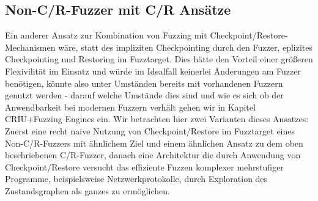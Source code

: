 \documentclass[a4paper]{article}
\begin{document}
\subsection{Non-C/R-Fuzzer mit C/R Ansätze}
Ein anderer Ansatz zur Kombination von Fuzzing mit Checkpoint/Restore-Mechanismen wäre, statt des impliziten Checkpointing durch den Fuzzer, eplizites Checkpointing und Restoring im Fuzztarget. 
Dies hätte den Vorteil einer größeren Flexivilität im Einsatz und würde im Idealfall keinerlei Änderungen am Fuzzer benötigen, könnte also unter Umständen bereits mit vorhandenen Fuzzern genutzt werden - darauf welche Umstände dies sind und wie es sich ob der Anwendbarkeit bei modernen Fuzzern verhält gehen wir in Kapitel CRIU+Fuzzing Engines ein.
Wir betrachten hier zwei Varianten dieses Ansatzes: Zuerst eine recht naive Nutzung von Checkpoint/Restore im Fuzztarget eines Non-C/R-Fuzzers mit ähnlichem Ziel und einem ähnlichen Ansatz zu dem oben beschriebenen C/R-Fuzzer, danach eine Architektur die durch Anwendung von Checkpoint/Restore versucht das effiziente Fuzzen komplexer mehrstufiger Programme, beispielsweise Netzwerkprotokolle, durch Exploration des Zustandsgraphen als ganzes zu ermöglichen.\\
\end{document}
